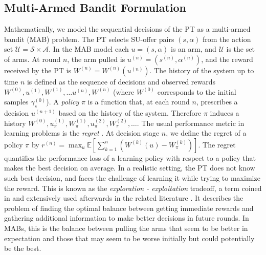 \subsection {Multi-Armed Bandit Formulation}
Mathematically, we model the sequential decisions of the PT as a multi-armed bandit (MAB) problem.
The PT selects SU-offer pairs $(s,\alpha)$ from the action set $\mathcal{U}=\mathcal{S}\times\mathcal{A}$.
In the MAB model each $u = (s,\alpha)$ is an arm, and $\mathcal{U}$ is the set of arms.
At round $n$, the arm pulled is $u^{(n)} = (s^{(n)},\alpha^{(n)})$, and the reward received by the PT is $W^{(n)} = W^{(n)}(u^{(n)})$.
The history of the system up to time $n$ is defined as the sequence of decisions and observed rewards $W^{(0)},u^{(1)}, W^{(1)},\ldots u^{(n)}, W^{(n)}$ (where $W^{(0)}$ corresponds to the initial samples $\gamma_s^{(0)}$).
A \textit{policy} $\pi$ is a function that, at each round $n$, prescribes a decision $u^{(n+1)}$ based on the history of the system. Therefore $\pi$ induces a history $W^{(0)},u_\pi^{(1)},W_\pi^{(1)},u_\pi^{(2)},W_\pi^{(2)},\ldots$. 
The usual performance metric in learning problems is the \textit{regret} \cite{ref:Bubeck2012}. 
At decision stage $n$, we define the regret of a policy $\pi$ by $r^{(n)} = \max_{u}\mathbb{E}\left[\sum_{k=1}^{n}\left(W^{(k)}(u) - W^{(k)}_{\pi}\right)\right]$.
The regret quantifies the performance loss of a learning policy with respect to a policy that makes the best decision on average.
In a realistic setting, the PT does not know such best decision, and faces the challenge of learning it while trying to maximize the reward. 
This is known as the \textit{exploration - exploitation} tradeoff, a term coined in \cite{ref:Gittins1974} and extensively used afterwards in the related literature \cite{ref:Sutton1998,ref:Powell2012}. It describes the problem of finding the optimal balance between getting immediate rewards and gathering additional information to make better decisions in future rounds. In MABs, this is the balance between pulling the arms that seem to be better in expectation and those that may seem to be worse initially but could potentially be the best.

